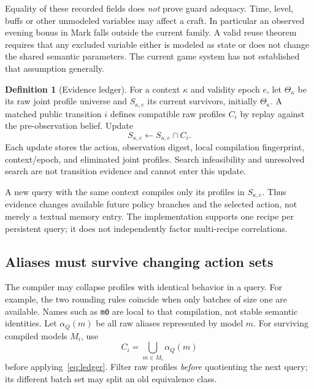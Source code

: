 \documentclass[11pt]{article}
\theoremstyle{definition}
\newtheorem{definition}[theorem]{Definition}
\begin{document}
Equality of these recorded fields does \emph{not} prove guard adequacy. Time,
level, buffs or other unmodeled variables may affect a craft. In particular an
observed evening bonus in Mark falls outside the current family. A valid reuse
theorem requires that any excluded variable either is modeled as state or does
not change the shared semantic parameters. The current game system has not
established that assumption generally.

\begin{definition}[Evidence ledger]
For a context $\kappa$ and validity epoch $e$, let $\Theta_\kappa$ be its raw
joint profile universe and $S_{\kappa,e}$ its current survivors, initially
$\Theta_\kappa$. A matched public transition $i$ defines compatible raw profiles
$C_i$ by replay against the pre-observation belief. Update
\begin{equation}\label{eq:ledger}
 S_{\kappa,e}\leftarrow S_{\kappa,e}\cap C_i.
\end{equation}
Each update stores the action, observation digest, local compilation fingerprint,
context/epoch, and eliminated joint profiles. Search infeasibility and unresolved
search are not transition evidence and cannot enter this update.
\end{definition}
A new query with the same context compiles only its profiles in $S_{\kappa,e}$.
Thus evidence changes available future policy branches and the selected action,
not merely a textual memory entry. The implementation supports one recipe per
persistent query; it does not independently factor multi-recipe correlations.

\subsection{Aliases must survive changing action sets}
The compiler may collapse profiles with identical behavior in a query. For
example, the two rounding rules coincide when only batches of size one are
available. Names such as \texttt{m0} are local to that compilation, not stable
semantic identities. Let $\alpha_Q(m)$ be all raw aliases represented by model
$m$. For surviving compiled models $M_i$, use
\[
 C_i=\bigcup_{m\in M_i}\alpha_Q(m)
\]
before applying~\eqref{eq:ledger}. Filter raw profiles \emph{before} quotienting
the next query; its different batch set may split an old equivalence class.
\end{document}
